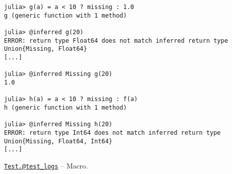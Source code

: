 \begin{adjustwidth}{2em}{0pt}
\begin{verbatim}
julia> g(a) = a < 10 ? missing : 1.0
g (generic function with 1 method)

julia> @inferred g(20)
ERROR: return type Float64 does not match inferred return type Union{Missing, Float64}
[...]

julia> @inferred Missing g(20)
1.0

julia> h(a) = a < 10 ? missing : f(a)
h (generic function with 1 method)

julia> @inferred Missing h(20)
ERROR: return type Int64 does not match inferred return type Union{Missing, Float64, Int64}
[...]
\end{verbatim}



\end{adjustwidth}
\hypertarget{1395021091279173086}{}
\hyperlink{1395021091279173086}{\texttt{Test.@test\_logs}}  -- {Macro.}

